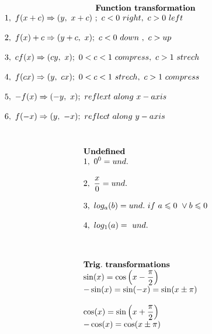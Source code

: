 \documentclass{article}
\begin{document}
\setlength{\columnsep}{7cm}
\begin{multicols}{2}
    \noindent 
    \[
    \begin{array}{>{\displaystyle}l}
        \\
        \\
        \centerline{\textbf{Function\ transformation}} \\
        1,\ f( x+c) \Rightarrow ( y,\ x+c) \ ;\ c< 0\ right,\ c >0\ left\\
        \\
        2,\ f( x) +c\Rightarrow ( y+c,\ x) ;\ c< 0\ down\ ,\ c >up\ \\
        \\
        3,\ cf( x) \Rightarrow ( cy,\ x) ;\ 0< c< 1\ compress,\ c >1\ strech\\
        \\
        4,\ f( cx) \Rightarrow ( y,\ cx) ;\ 0< c< 1\ strech,\ c >1\ compress\ \\
        \\
        5,\ -f( x) \Rightarrow ( -y,\ x) ;\ reflext\ along\ x-axis\ \\
        \\
        6,\ f( -x) \Rightarrow ( y,\ -x) ;\ reflect\ along\ y-axis
    \end{array}
    \]
    \columnbreak
    \noindent 
    \[
    \begin{array}{>{\displaystyle}l}
        \\
        \\
        \textbf{Undefined}\\
        1,\ 0^{0} =und.\ \\
        \\
        2,\ \frac{x}{0} =und.\\
        \\
        3,\ log_{a}( b) =und.\ if\ a\leqslant 0\ \lor b\leqslant 0\\
        \\
        4,\ log_{1}( a) =\ und.
        \\
        \\
        \\
        \\
        \mathbf{Trig.\ transformations}\\
        \sin( x) =\cos\left( x-\frac{\pi }{2}\right)\\
        -\sin( x) =\sin( -x) =\sin( x\pm \pi )\\
        \\
        \cos( x) =\sin\left( x+\frac{\pi }{2}\right)\\
        -\cos( x) =\cos( x\pm \pi )
    \end{array}
    \]
\end{multicols}
\end{document}
